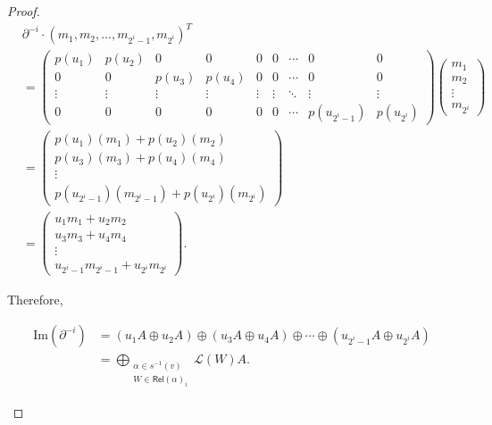 \documentclass[10pt,a4paper]{amsart}
\begin{document}
\begin{proof}
	\[
	\begin{aligned}
		&\partial^{-i} \cdot (m_1, m_2, \ldots, m_{2^i - 1}, m_{2^i})^T \\
		&= \begin{pmatrix}
			p(u_1) & p(u_2) & 0 & 0 & 0 & 0 & \cdots & 0 & 0 \\
			0 & 0 & p(u_3) & p(u_4) & 0 & 0 & \cdots & 0 & 0 \\
			\vdots & \vdots & \vdots & \vdots & \vdots & \vdots & \ddots & \vdots & \vdots \\
			0 & 0 & 0 & 0 & 0 & 0 & \cdots & p(u_{2^i - 1}) & p(u_{2^i})
		\end{pmatrix} \begin{pmatrix}
			m_1 \\
			m_2 \\
			\vdots \\
			m_{2^i}
		\end{pmatrix} \\
		&= \begin{pmatrix}
			p(u_1)(m_1) + p(u_2)(m_2) \\
			p(u_3)(m_3) + p(u_4)(m_4) \\
			\vdots \\
			p(u_{2^i - 1})(m_{2^i - 1}) + p(u_{2^i})(m_{2^i})
		\end{pmatrix} \\
		&= \begin{pmatrix}
			u_1 m_1 + u_2 m_2 \\
			u_3 m_3 + u_4 m_4 \\
			\vdots \\
			u_{2^i - 1} m_{2^i - 1} + u_{2^i} m_{2^i}
		\end{pmatrix}.
	\end{aligned}
	\]
	
	Therefore, 
	\begin{center}
	\begin{align*}
		\text{Im}(\partial^{-i}) 
		&= (u_1 A \oplus u_2 A) \oplus (u_3 A \oplus u_4 A) \oplus \cdots \oplus (u_{2^i - 1} A \oplus u_{2^i} A) \\
		&= \bigoplus\limits_{\substack{\alpha \in s^{-1}(v) \\ W \in \mathsf{Rel}(\alpha)_i}} \mathscr{L}(W)A .
	\end{align*}
	\end{center}
	

\end{proof}
\end{document}
